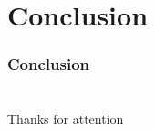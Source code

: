 \documentclass[xcolor=table]{beamer}
\begin{document}
\section{Conclusion}
\begin{frame} \frametitle{Conclusion}

\end{frame}


\section{}
\begin{frame} \frametitle{}
    \begin{center}
        Thanks for attention
    \end{center}
\end{frame}
\end{document}
